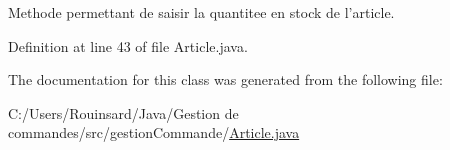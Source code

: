 Methode permettant de saisir la quantitee en stock de l'article. 



Definition at line 43 of file Article.\-java.



The documentation for this class was generated from the following file\-:\begin{DoxyCompactItemize}
\item 
C\-:/\-Users/\-Rouinsard/\-Java/\-Gestion de commandes/src/gestion\-Commande/\hyperlink{_article_8java}{Article.\-java}\end{DoxyCompactItemize}
